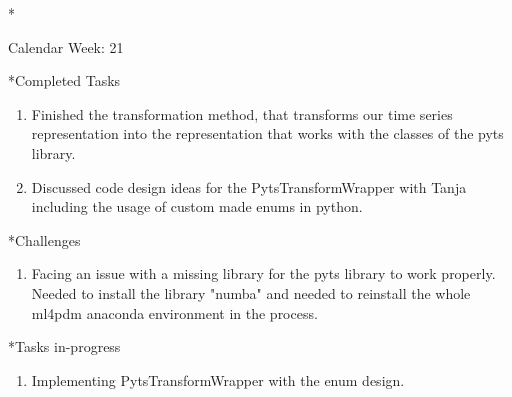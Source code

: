 \documentclass[11pt,a4paper]{article}
\begin{document}
\newpage
\begin{section}*{Calendar Week: 21 \hfill \date{28 May, 2021}}
	
	\begin{subsection}*{Completed Tasks}
		\begin{enumerate}
			\item Finished the transformation method, that transforms our time series representation into the representation that works with the classes of the pyts library.
			\item Discussed code design ideas for the PytsTransformWrapper with Tanja including the usage of custom made enums in python.
		\end{enumerate}
	\end{subsection}
	
	\begin{subsection}*{Challenges}
		\begin{enumerate}
			\item Facing an issue with a missing library for the pyts library to work properly. Needed to install the library "numba" and needed to reinstall the whole ml4pdm anaconda environment in the process.
		\end{enumerate}
	\end{subsection}
	
	\begin{subsection}*{Tasks in-progress}
		\begin{enumerate}
			\item Implementing PytsTransformWrapper with the enum design.
		\end{enumerate}
	\end{subsection}
	
\end{section}
\end{document}
